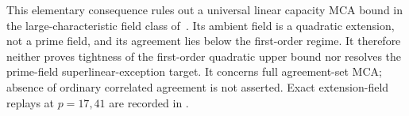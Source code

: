 This elementary consequence rules out a universal linear capacity MCA
bound in the large-characteristic field class of~\cite{dkt2026}.
Its ambient field is a quadratic extension, not a prime field, and its
agreement lies below the first-order regime. It therefore neither proves
tightness of the first-order quadratic upper bound nor resolves the
prime-field superlinear-exception target. It concerns full agreement-set
MCA; absence of ordinary correlated agreement is not asserted.
Exact extension-field replays at $p=17,41$ are recorded in
.
